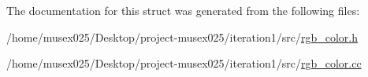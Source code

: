 The documentation for this struct was generated from the following files\+:\begin{DoxyCompactItemize}
\item 
/home/musex025/\+Desktop/project-\/musex025/iteration1/src/\hyperlink{rgb__color_8h}{rgb\+\_\+color.\+h}\item 
/home/musex025/\+Desktop/project-\/musex025/iteration1/src/\hyperlink{rgb__color_8cc}{rgb\+\_\+color.\+cc}\end{DoxyCompactItemize}
